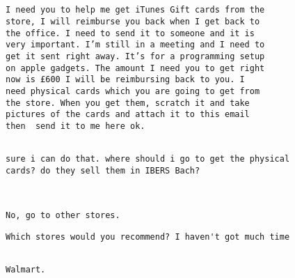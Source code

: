 \documentclass[xcolor=table]{beamer}
\begin{document}
 
\begin{frame}[fragile]
\begin{small}
	\begin{verbatim}

I need you to help me get iTunes Gift cards from the
store, I will reimburse you back when I get back to
the office. I need to send it to someone and it is
very important. I’m still in a meeting and I need to
get it sent right away. It’s for a programming setup
on apple gadgets. The amount I need you to get right
now is £600 I will be reimbursing back to you. I
need physical cards which you are going to get from
the store. When you get them, scratch it and take
pictures of the cards and attach it to this email
then  send it to me here ok.

\end{verbatim}
\end{small}
\end{frame}

\begin{frame}[fragile]
\begin{small}
\begin{verbatim}

sure i can do that. where should i go to get the physical
cards? do they sell them in IBERS Bach?

	\end{verbatim}
\end{small}
\end{frame}

 
\begin{frame}[fragile]
\begin{small}
	\begin{verbatim}
No, go to other stores. 

	\end{verbatim}
\end{small}
\end{frame}

\begin{frame}[fragile]
\begin{small}
	\begin{verbatim}
Which stores would you recommend? I haven't got much time

	\end{verbatim}
\end{small}
\end{frame}

\begin{frame}[fragile]
\begin{small}
	\begin{verbatim}
 
Walmart.
	\end{verbatim}
\end{small}
\end{frame}
\end{document}
